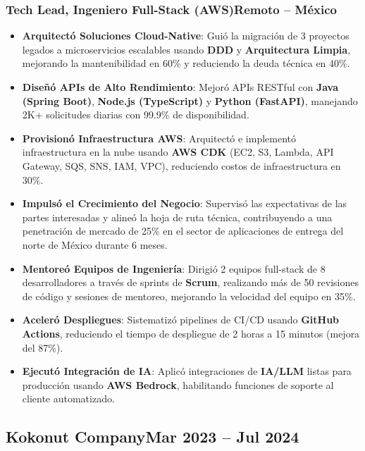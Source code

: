 \documentclass[a4paper,10pt]{article}
\newcommand{\kw}[1]{\textbf{\textcolor{keyword}{#1}}}
\newcommand{\tech}[1]{\textbf{\textcolor{tech}{#1}}}
\begin{document}
\subsubsection*{\small Tech Lead, Ingeniero Full-Stack (AWS)\hfill Remoto -- México}
\begin{itemize}[noitemsep, leftmargin=*]
    \item \textbf{Arquitectó Soluciones Cloud-Native}: Guió la migración de 3 proyectos legados a microservicios escalables usando \kw{DDD} y \kw{Arquitectura Limpia}, mejorando la mantenibilidad en 60\% y reduciendo la deuda técnica en 40\%.
    \item \textbf{Diseñó APIs de Alto Rendimiento}: Mejoró APIs RESTful con \tech{Java (Spring Boot)}, \tech{Node.js (TypeScript)} y \tech{Python (FastAPI)}, manejando 2K+ solicitudes diarias con 99.9\% de disponibilidad.
    \item \textbf{Provisionó Infraestructura AWS}: Arquitectó e implementó infraestructura en la nube usando \tech{AWS CDK} (EC2, S3, Lambda, API Gateway, SQS, SNS, IAM, VPC), reduciendo costos de infraestructura en 30\%.
    \item \textbf{Impulsó el Crecimiento del Negocio}: Supervisó las expectativas de las partes interesadas y alineó la hoja de ruta técnica, contribuyendo a una penetración de mercado de 25\% en el sector de aplicaciones de entrega del norte de México durante 6 meses.
    \item \textbf{Mentoreó Equipos de Ingeniería}: Dirigió 2 equipos full-stack de 8 desarrolladores a través de sprints de \kw{Scrum}, realizando más de 50 revisiones de código y sesiones de mentoreo, mejorando la velocidad del equipo en 35\%.
    \item \textbf{Aceleró Despliegues}: Sistematizó pipelines de CI/CD usando \tech{GitHub Actions}, reduciendo el tiempo de despliegue de 2 horas a 15 minutos (mejora del 87\%).
    \item \textbf{Ejecutó Integración de IA}: Aplicó integraciones de \kw{IA/LLM} listas para producción usando \tech{AWS Bedrock}, habilitando funciones de soporte al cliente automatizado.
\end{itemize}

\subsection*{\small Kokonut Company\hfill\textbf{Mar 2023 -- Jul 2024}}
\end{document}
